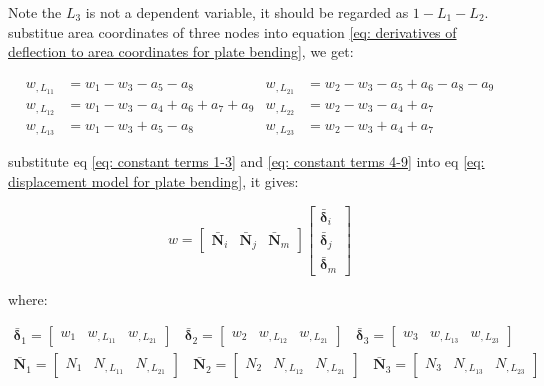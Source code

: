 Note the $ L_3 $ is not a dependent variable, it should be regarded as $ 1-L_1 - L_2 $. substitue area coordinates of three nodes into equation \ref{eq: derivatives of deflection to area coordinates for plate bending}, we get:

\begin{align*}
	w_{,L_{11}} &= w_1 - w_3 - a_5 -a_8 & w_{,L_{21}} &= w_2 - w_3 - a_5 + a_6 -a_8 -a_9 \\
	w_{,L_{12}} &= w_1 - w_3 -a_4 + a_6 + a_7 + a_9 & w_{,L_{22}} &= w_2- w_3-a_4+a_7 \\
	w_{,L_{13}} &= w_1 - w_3 + a_5 -a_8 & w_{,L_{23}} &= w_2 - w_3 + a_4 + a_7
\end{align*}

substitute eq \ref{eq: constant terms 1-3} and \ref{eq: constant terms 4-9} into eq \ref{eq: displacement model for plate bending}, it gives:

\begin{equation} \label{eq: nodal displacements definition}
w = \begin{bmatrix}
\bar{\mathbf{N}}_i & \bar{\mathbf{N}}_j & \bar{\mathbf{N}}_m
\end{bmatrix}
 \begin{bmatrix}
 \bar{\mathbf{\delta}}_i \\ 
 \bar{\mathbf{\delta}}_j \\ 
 \bar{\mathbf{\delta}}_m
 \end{bmatrix} 
\end{equation}

where:

\begin{equation*}
	\begin{split}
	\bar{\mathbf{\delta}}_1 = \begin{bmatrix}
		w_1 & w_{,L_{11}} & w_{,L_{21}}
		\end{bmatrix}~~~~\bar{\mathbf{\delta}}_2 = \begin{bmatrix}
		w_2 & w_{,L_{12}} & w_{,L_{21}} \end{bmatrix}~~~~\bar{\mathbf{\delta}}_3 = \begin{bmatrix}	w_3 & w_{,L_{13}} & w_{,L_{23}} \end{bmatrix} \\
		\bar{\mathbf{N}}_1 = \begin{bmatrix}
			N_1 & N_{,L_{11}} & N_{,L_{21}}
		\end{bmatrix}~~~~\bar{\mathbf{N}}_2 = \begin{bmatrix}
		N_2 & N_{,L_{12}} & N_{,L_{21}} \end{bmatrix}~~~~\bar{\mathbf{N}}_3 = \begin{bmatrix}	N_3 & N_{,L_{13}} & N_{,L_{23}} \end{bmatrix}
	\end{split}	
\end{equation*}

